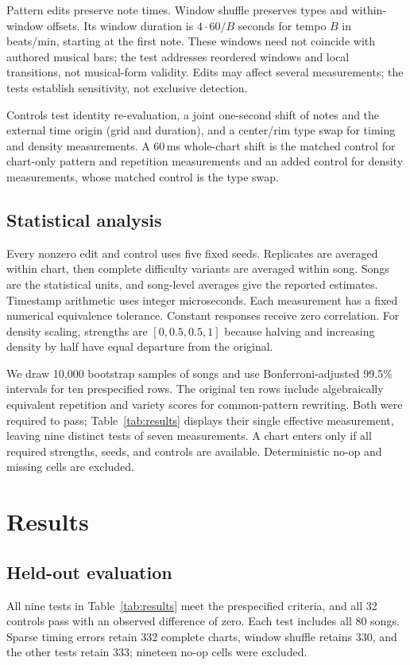 \documentclass[letterpaper]{article}
\begin{document}
Pattern edits preserve note times. Window shuffle preserves types and
within-window offsets. Its window duration is $4\cdot60/B$ seconds for
tempo $B$ in beats/min, starting at the first note. These windows need not
coincide with authored musical bars; the test addresses reordered windows
and local transitions, not musical-form validity. Edits may affect several
measurements; the tests establish sensitivity, not exclusive detection.

Controls test identity re-evaluation, a joint one-second shift of notes and
the external time origin (grid and duration), and a center/rim type swap for
timing and density measurements. A 60\,ms whole-chart shift is the matched
control for chart-only pattern and repetition measurements and an added
control for density measurements, whose matched control is the type swap.

\subsection{Statistical analysis}
Every nonzero edit and control uses five fixed seeds. Replicates are
averaged within chart, then complete difficulty variants are averaged within
song. Songs are the statistical units, and song-level averages give the
reported estimates. Timestamp arithmetic uses integer microseconds. Each
measurement has a fixed numerical equivalence tolerance. Constant responses
receive zero correlation. For density scaling, strengths are
$[0,0.5,0.5,1]$ because halving and increasing density by half have equal
departure from the original.

We draw 10{,}000 bootstrap samples of songs and use Bonferroni-adjusted
99.5\% intervals for ten prespecified rows. The original ten rows include algebraically equivalent repetition
and variety scores for common-pattern rewriting. Both were required to
pass; Table~\ref{tab:results} displays their single effective measurement,
leaving nine distinct tests of seven measurements. A chart enters only if
all required strengths, seeds, and controls are available. Deterministic
no-op and missing cells are excluded.

\section{Results}
\label{sec:results}
\subsection{Held-out evaluation}
\label{sec:heldout}
All nine tests in Table~\ref{tab:results} meet the prespecified criteria,
and all 32 controls pass with an observed difference of zero. Each test
includes all 80 songs. Sparse timing errors retain 332 complete charts,
window shuffle retains 330, and the other tests retain 333; nineteen no-op
cells were excluded.
\end{document}
